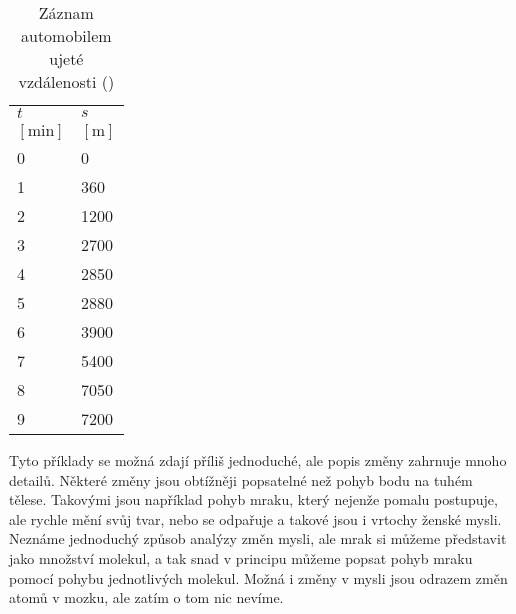 {    \begin{wraptable}[23]{r}{4cm}      %
      \centering
      \renewcommand{\arraystretch}{1.4}
      \begin{tabular}{>{\centering\arraybackslash}p{3em}|>{\centering\arraybackslash}p{3em}}
         \hline \(t\)     & \(s\)          \\
         \([\text{min}]\) & \([\text{m}]\) \\
         \hline   \num{0} & \num{0}        \\
                  \num{1} & \num{360}      \\
                  \num{2} & \num{1200}     \\
                  \num{3} & \num{2700}     \\
                  \num{4} & \num{2850}     \\
                  \num{5} & \num{2880}     \\
                  \num{6} & \num{3900}     \\
                  \num{7} & \num{5400}     \\
                  \num{8} & \num{7050}     \\
                  \num{9} & \num{7200}     \\
         \hline 
      \end{tabular}
      \caption{Záznam automobilem ujeté vzdálenosti (\cite[s.~109]{Feynman01})}
      \label{fyz:tab002}
    \end{wraptable}
    Tyto příklady se možná zdají příliš jednoduché, ale popis změny zahrnuje mnoho detailů. Některé 
    změny jsou obtížněji popsatelné než pohyb bodu na tuhém tělese. Takovými jsou například pohyb 
    mraku, který nejenže pomalu postupuje, ale rychle mění svůj tvar, nebo se odpařuje a takové 
    jsou i vrtochy ženské mysli. Neznáme jednoduchý způsob analýzy změn mysli, ale mrak si můžeme 
    představit jako množství molekul, a tak snad v principu můžeme popsat pohyb mraku pomocí pohybu 
    jednotlivých molekul. Možná i změny v mysli jsou odrazem změn atomů v mozku, ale zatím o tom 
    nic nevíme.

}
